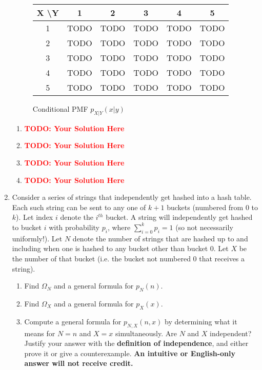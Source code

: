 \documentclass[12pt]{article}
\def\todo#1{\textcolor{red}{\textbf{#1}}}
\renewcommand{\|}{\mid}
\begin{document}
\begin{enumerate}
{
\begin{figure}[h]
\caption{Conditional PMF $p_{X|Y}(x|y)$}
\centering
\begin{center}
 \begin{tabular}{|c |c |c| c| c| c|} 
 \hline
 X \textbackslash Y & 1 & 2 & 3 & 4 & 5 \\ [0.5ex] 
 \hline
 1 & TODO & TODO & TODO & TODO & TODO  \\ 
 \hline
 2 & TODO & TODO & TODO & TODO & TODO \\
 \hline
 3 & TODO & TODO & TODO & TODO & TODO \\
 \hline
 4 & TODO & TODO & TODO & TODO & TODO \\
 \hline
 5 & TODO & TODO & TODO & TODO & TODO \\ 
 \hline
\end{tabular}
\end{center}\end{figure}}

\begin{tcolorbox}
\begin{enumerate}
\item \todo{TODO: Your Solution Here}
\item \todo{TODO: Your Solution Here}
\item \todo{TODO: Your Solution Here}
\item \todo{TODO: Your Solution Here}
\end{enumerate}
\end{tcolorbox}

\item Consider a series of strings that independently get hashed into a hash table. Each such string
can be sent to any one of $k+1$ buckets (numbered from $0$ to $k$). Let index $i$ denote the
$i^{th}$ bucket. A string will independently get hashed to bucket $i$ with probability $p_i$, where $\sum_{i=0}^{k}{p_i}=1$ (so not necessarily uniformly!). Let $N$ denote the number of strings that are hashed up to and including when one is hashed to any
bucket other than bucket $0$. Let $X$ be the number of that bucket (i.e. the bucket not numbered
$0$ that receives a string).
\begin{enumerate}
    \item Find $\Omega_N$ and a general formula for $p_N(n)$.
    \item Find $\Omega_X$ and a general formula for $p_X(x)$.
    \item Compute a general formula for $p_{N,X}(n,x)$ by determining what it means for $N=n$ and $X=x$ simultaneously. Are $N$ and $X$ independent? Justify your answer with the \textbf{definition of independence}, and either prove it or give a counterexample. \textbf{An intuitive or English-only answer will not receive credit.} 
\end{enumerate}


\end{enumerate}
\end{document}
